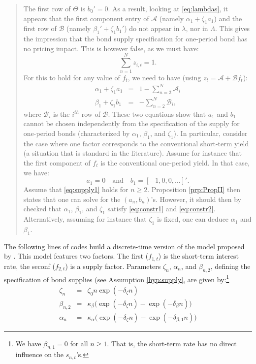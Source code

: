 \documentclass[
  12pt,
]{book}
\theoremstyle{definition}
\theoremstyle{definition}
\theoremstyle{definition}
\theoremstyle{definition}
\theoremstyle{remark}
\begin{document}
\begin{quote}
The first row of \(\Theta\) is \(b_0'=0\). As a result, looking at \eqref{eq:lambdas}, it appears that the first component entry of \(\mathcal{A}\) (namely \(\alpha_1 + \zeta_1 a_1\)) and the first row of \(\mathcal{B}\) (namely \(\beta_1' + \zeta_1 b_1'\)) do not appear in \(\lambda\), nor in \(\Lambda\). This gives the impression that the bond supply specification for one-period bond has no pricing impact. This is however false, as we must have:
\[
\sum_{n=1}^N z_{i,t} = 1.
\]
For this to hold for any value of \(f_t\), we need to have (using \(z_t = \mathcal{A} + \mathcal{B}f_t\)):
\begin{eqnarray}
\alpha_1 + \zeta_1 a_1 &=& 1 - \sum_{n=2}^N\mathcal{A}_i \label{eq:constr1}\\
\beta_1 + \zeta_1 b_1&=&  - \sum_{n=2}^N\mathcal{B}_i,\label{eq:constr2}
\end{eqnarray}
where \(\mathcal{B}_i\) is the \(i^{th}\) row of \(\mathcal{B}\). These two equations show that \(a_1\) and \(b_1\) cannot be chosen independently from the specification of the supply for one-period bonds (characterized by \(\alpha_1\), \(\beta_1\), and \(\zeta_1\)).
In particular, consider the case where one factor corresponds to the conventional short-term yield (a situation that is standard in the literature). Assume for instance that the first component of \(f_t\) is the conventional one-period yield. In that case, we have:
\[
a_1 = 0 \quad \mbox{and}\quad b_1 = [-1,0,0,\dots]'.
\]
Assume that \eqref{eq:supply1} holds for \(n \ge 2\). Proposition \ref{prp:PropII} then states that one can solve for the \((a_n,b_n)\)'s. However, it should then by checked that \(\alpha_1\), \(\beta_1\), and \(\zeta_1\) satisfy \eqref{eq:constr1} and \eqref{eq:constr2}. Alternatively, assuming for instance that \(\zeta_1\) is fixed, one can deduce \(\alpha_1\) and \(\beta_1\).
\end{quote}

The following lines of codes build a discrete-time version of the model proposed by \citet{Vayanos_Vila_2021}. This model features two factors. The first (\(f_{1,t}\)) is the short-term interest rate, the seconf (\(f_{2,t}\)) is a supply factor. Parameters \(\zeta_n\), \(\alpha_n\), and \(\beta_{n,2}\), defining the specification of bond supplies (see Assumption \ref{hyp:supply}, are given by:\footnote{We have \(\beta_{n,1}=0\) for all \(n \ge 1\). That is, the short-term rate has no direct influence on the \(s_{n,t}\)'s.}
\begin{eqnarray}
\zeta_n &=& \zeta_0 n \exp(-\delta_\zeta n) \\
\beta_{n,2} &=& \kappa_{\beta} \big( \exp(-\delta_\zeta n) - \exp(-\delta_{\beta} n) \big) \\
\alpha_n &=& \kappa_\alpha \big( \exp(-\delta_\zeta n) - \exp(-\delta_{\beta,1} n) \big) \end{eqnarray}
\end{document}
